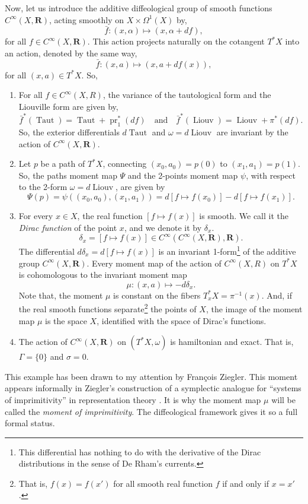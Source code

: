 \documentclass[10pt,reqno,twoside]{amsart}
\newcommand{\qmbox}[1]{\quad\mbox{#1}\quad}
\newcommand{\RR}{\mathbf{R}}
\DeclareMathOperator{\pr}{pr}
\DeclareMathOperator{\Taut}{Taut}
\DeclareMathOperator{\Liouv}{Liouv}
\newcommand{\Cinfty}{C^\infty}
\newcommand{\R}{R}
\newcommand{\T}{T}
\theoremstyle{plain}
\theoremstyle{definition}
\begin{document}
  Now,
  let us introduce the additive diffeological group of smooth functions $\Cinfty(X,\RR)$,
  acting smoothly on $X \times \Omega^1(X)$ by,
  $$
    \bar f : (x, \alpha) \mapsto (x , \alpha + df),
    $$
  for all $f \in \Cinfty(X,\RR)$.
  This action projects naturally on the cotangent $\T^*X$ into an action,
  denoted by the same way,
  $$
    \bar f : (x,a) \mapsto (x, a + df(x)),
    $$
  for all $(x,a) \in \T^*X$.
  So,
  \begin{enumerate}
    \item For all $f \in \Cinfty(X,\R)$, the variance of the tautological form and the Liouville form are given by,
    $$
      \bar f ^*(\Taut) = \Taut + \pr_1^*(df) \qmbox{and} \bar f^*(\Liouv) = \Liouv + \pi^*(df).
      $$
    So, the exterior differentials $d\Taut$ and $\omega = d\Liouv$ are invariant by the action of $\Cinfty(X,\RR)$.
    \item Let $p$ be a path of $\T^*X$, connecting $(x_0,a_0) = p(0)$ to $(x_1,a_1) = p(1)$. So, the paths moment map $\Psi$ and the 2-points moment map $\psi$, with respect to the 2-form $\omega = d \Liouv$, are given by
    $$
      \Psi(p) = \psi((x_0,a_0),(x_1,a_1)) = d[f \mapsto f(x_0)] - d[f \mapsto f(x_1)].
      $$
    \item For every $x \in X$, the real function $[f \mapsto f(x)]$ is smooth. We call it the {\em Dirac function} of the point $x$, and we denote it by $\delta_x$.
    $$
      \delta_x = [f \mapsto f(x)] \in \Cinfty(\Cinfty(X,\RR),\RR).
      $$
    The differential $d \delta_x = d[f \mapsto f(x)]$ is an invariant 1-form\footnote{This differential has nothing to do with the derivative of the Dirac distributions in the sense of De Rham's currents.} of the additive group $\Cinfty(X,\RR)$. Every moment map of the action of $\Cinfty(X,\R)$ on $\T^*X$ is cohomologous to the invariant moment map
    $$
      \mu : (x,a) \mapsto - d \delta_x.
      $$
    Note that, the moment $\mu$ is constant on the fibers $\T_x^*X = \pi^{-1}(x)$. And, if the real smooth functions separate\footnote{That is, $f(x) = f(x')$ for all smooth real function $f$ if and only if $x=x'$.} the points of $X$, the image of the moment map $\mu$ is the space $X$, identified with the space of Dirac's functions.
    \item The action of $\Cinfty(X,\RR)$ on $(\T^*X,\omega)$ is hamiltonian and exact. That is, $\Gamma = \{0\}$ and $\sigma = 0$.
  \end{enumerate}
  
  This example has been drawn to my attention by Fran\c{c}ois Ziegler.
  This moment appears informally in Ziegler's construction of a symplectic analogue for ``systems of imprimitivity'' in representation theory \cite{Zie96}.
  It is why the moment map $\mu$ will be called the {\em moment of imprimitivity}.
  The diffeological framework gives it so a full formal status.
  
\end{document}
